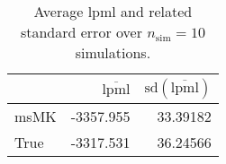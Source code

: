 \begin{table}[H]

\caption{Average lpml and related standard error over $n_{\text{sim}} = 10$ simulations.}
\centering
\begin{tabular}[t]{lrr}
\toprule
  & $\overbar{\text{lpml}}$ & $\text{sd}(\overbar{\text{lpml}})$\\
\midrule
msMK & -3357.955 & 33.39182\\
True & -3317.531 & 36.24566\\
\bottomrule
\end{tabular}
\end{table}
